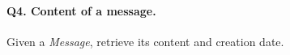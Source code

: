 \paragraph{\textbf{Q4}. Content of a message.}
Given a \emph{Message}, retrieve its content and creation date.
